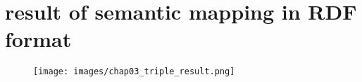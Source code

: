 
\chapter{result of semantic mapping in RDF format}
\begin{center}
	\begin{figure}[htb!]
		
		\begin{minipage}{0.35\linewidth}
			\centering
			\texttt{[image: images/chap03\_triple\_result.png]}
		\end{minipage}
		
	\end{figure}
	
\end{center}